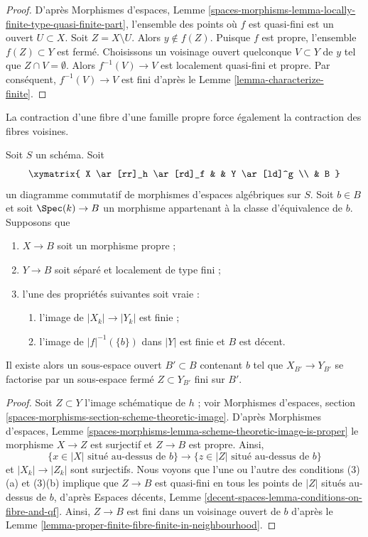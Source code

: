 \begin{proof}
D'après
Morphismes d'espaces, Lemme
\ref{spaces-morphisms-lemma-locally-finite-type-quasi-finite-part},
l'ensemble des points où $f$ est quasi-fini est un ouvert $U \subset X$.
Soit $Z = X \setminus U$. Alors $y \not \in f(Z)$. Puisque $f$ est propre,
l'ensemble $f(Z) \subset Y$ est fermé. Choisissons un voisinage ouvert quelconque
$V \subset Y$ de $y$ tel que $Z \cap V = \emptyset$. Alors
$f^{-1}(V) \to V$ est localement quasi-fini et propre.
Par conséquent, $f^{-1}(V) \to V$ est fini d'après le Lemme \ref{lemma-characterize-finite}.
\end{proof}

\begin{lemma}
\label{lemma-flat-proper-family-cannot-collapse-fibre}
\begin{slogan}
La contraction d'une fibre d'une famille propre force également la contraction des fibres voisines.
\end{slogan}
Soit $S$ un schéma. Soit
$$
\xymatrix{
X \ar[rr]_h \ar[rd]_f & & Y \ar[ld]^g \\
& B
}
$$
un diagramme commutatif de morphismes d'espaces algébriques sur $S$.
Soit $b \in B$ et soit $\Spec(k) \to B$ un morphisme appartenant à la classe
d'équivalence de $b$. Supposons que
\begin{enumerate}
\item $X \to B$ soit un morphisme propre ;
\item $Y \to B$ soit séparé et localement de type fini ;
\item l'une des propriétés suivantes soit vraie :
\begin{enumerate}
\item l'image de $|X_k| \to |Y_k|$ est finie ;
\item l'image de $|f|^{-1}(\{b\})$ dans $|Y|$ est finie
et $B$ est décent.
\end{enumerate}
\end{enumerate}
Il existe alors un
sous-espace ouvert $B' \subset B$ contenant $b$ tel que $X_{B'} \to Y_{B'}$
se factorise par un sous-espace fermé $Z \subset Y_{B'}$ fini sur $B'$.
\end{lemma}

\begin{proof}
Soit $Z \subset Y$ l'image schématique de $h$ ; voir
Morphismes d'espaces, section
\ref{spaces-morphisms-section-scheme-theoretic-image}.
D'après Morphismes d'espaces, Lemme
\ref{spaces-morphisms-lemma-scheme-theoretic-image-is-proper}
le morphisme $X \to Z$ est surjectif et $Z \to B$ est propre.
Ainsi,
$$
\{x \in |X|\text{ situé au-dessus de }b\} \to
\{z \in |Z|\text{ situé au-dessus de }b\}
$$
et $|X_k| \to |Z_k|$ sont surjectifs. Nous voyons que l'une ou l'autre
des conditions (3)(a) et (3)(b) implique que $Z \to B$ est quasi-fini
en tous les points de $|Z|$ situés au-dessus de $b$, d'après
Espaces décents, Lemme \ref{decent-spaces-lemma-conditions-on-fibre-and-qf}.
Ainsi, $Z \to B$ est fini dans un voisinage ouvert de $b$ d'après le
Lemme \ref{lemma-proper-finite-fibre-finite-in-neighbourhood}.
\end{proof}








